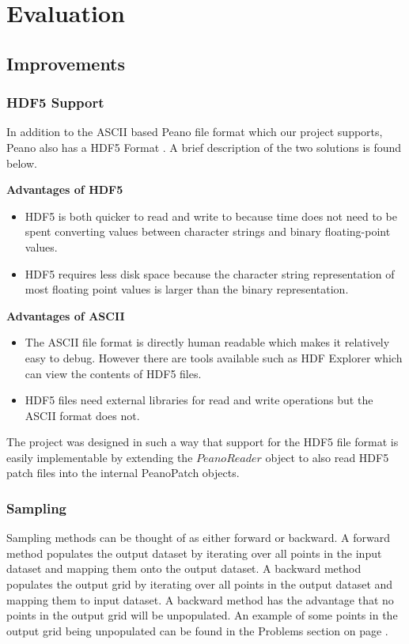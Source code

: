 \documentclass[12pt,a4paper]{article}
\begin{document}
\section{Evaluation}

\subsection{Improvements}
\subsubsection{HDF5 Support}
In addition to the ASCII based Peano file format which our project supports, Peano also has a HDF5 Format \cite{hdf5}. A brief description of the two solutions is found below.

\textbf{Advantages of HDF5}
\begin{itemize}
\item HDF5 is both quicker to read and write to because time does not need to be spent converting values between character strings and binary floating-point values.
\item HDF5 requires less disk space because the character string representation of most floating point values is larger than the binary representation.
\end{itemize}

\textbf{Advantages of ASCII}
\begin{itemize}
\item The ASCII file format is directly human readable which makes it relatively easy to debug. However there are tools available such as HDF Explorer \cite{hdfexplorer} which can view the contents of HDF5 files.
\item HDF5 files need external libraries for read and write operations but the ASCII format does not.
\end{itemize}

The project was designed in such a way that support for the HDF5 file format is easily implementable by extending the $PeanoReader$ object to also read HDF5 patch files into the internal PeanoPatch objects.

\subsubsection{Sampling}
Sampling methods can be thought of as either forward or backward. A forward method populates the output dataset by iterating over all points in the input dataset and mapping them onto the output dataset. A backward method populates the output grid by iterating over all points in the output dataset and mapping them to input dataset. A backward method has the advantage that no points in the output grid will be unpopulated. An example of some points in the output grid being unpopulated can be found in the Problems section on page \pageref{blank-artifacts}.
\end{document}
